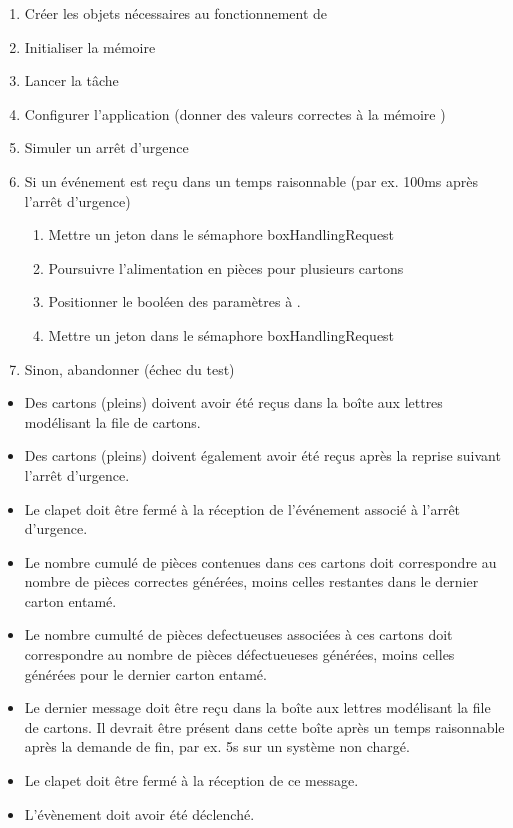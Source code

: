 {
\begin{enumerate}
	\item Créer les objets nécessaires au fonctionnement de 
	\item Initialiser la mémoire 
	\item Lancer la tâche 
	\item Configurer l'application (donner des valeurs correctes à la mémoire )
	\item Simuler un arrêt d'urgence
	\item Si un événement  est reçu dans un temps raisonnable (par ex. 100ms après l'arrêt d'urgence)
		\begin{enumerate}
			\item Mettre un jeton dans le sémaphore boxHandlingRequest
			\item Poursuivre l'alimentation en pièces pour plusieurs cartons
			\item Positionner le booléen  des paramètres à .
			\item Mettre un jeton dans le sémaphore boxHandlingRequest
		\end{enumerate}
	\item Sinon, abandonner (échec du test)
\end{enumerate}
}
{
\begin{itemize}
	\item Des cartons (pleins) doivent avoir été reçus dans la boîte aux lettres modélisant la file de cartons.
	\item Des cartons (pleins) doivent également avoir été reçus après la reprise suivant l'arrêt d'urgence.
	\item Le clapet doit être fermé à la réception de l'événement associé à l'arrêt d'urgence.
	\item Le nombre cumulé de pièces contenues dans ces cartons doit correspondre au nombre de pièces correctes générées, moins celles restantes dans le dernier carton entamé.
	\item Le nombre cumulté de pièces defectueuses associées à ces cartons doit correspondre au nombre de pièces défectueueses générées, moins celles générées pour le dernier carton entamé.
	\item Le dernier message doit être reçu dans la boîte aux lettres modélisant la file de cartons. Il devrait être présent dans cette boîte après un temps raisonnable après la demande de fin, par ex. 5s sur un système non chargé.
	\item Le clapet doit être fermé à la réception de ce message.
	\item L'évènement  doit avoir été déclenché.
\end{itemize}
}
